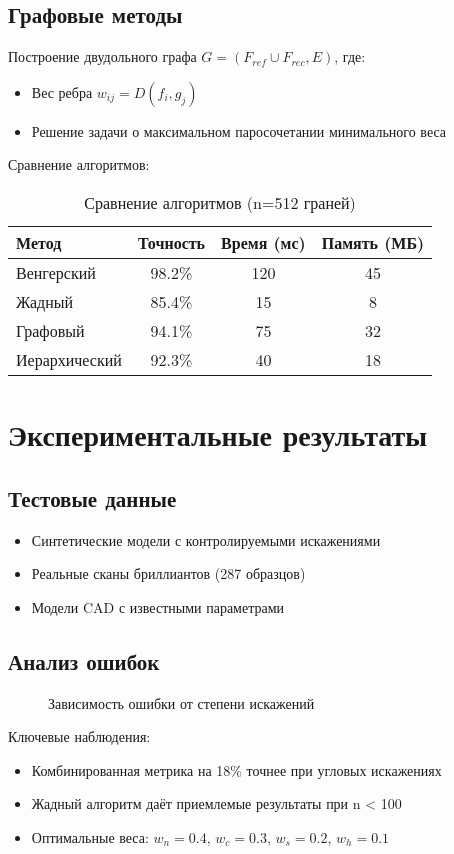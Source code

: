 \documentclass[a4paper,14pt]{extarticle}
\begin{document}
\subsection{Графовые методы}
Построение двудольного графа $G=(F_{ref} \cup F_{rec}, E)$, где:
\begin{itemize}
    \item Вес ребра $w_{ij} = D(f_i, g_j)$
    \item Решение задачи о максимальном паросочетании минимального веса
\end{itemize}

Сравнение алгоритмов:
\begin{table}[H]
\centering
\begin{tabular}{@{}lccc@{}}
\toprule
Метод & Точность & Время (мс) & Память (МБ) \\ \midrule
Венгерский & 98.2\% & 120 & 45 \\
Жадный & 85.4\% & 15 & 8 \\
Графовый & 94.1\% & 75 & 32 \\
Иерархический & 92.3\% & 40 & 18 \\ \bottomrule
\end{tabular}
\caption{Сравнение алгоритмов (n=512 граней)}
\end{table}

\section{Экспериментальные результаты}
\subsection{Тестовые данные}
\begin{itemize}
    \item Синтетические модели с контролируемыми искажениями
    \item Реальные сканы бриллиантов (287 образцов)
    \item Модели CAD с известными параметрами
\end{itemize}

\subsection{Анализ ошибок}
\begin{figure}[H]
\centering
\caption{Зависимость ошибки от степени искажений}
\label{fig:errors}
\end{figure}

Ключевые наблюдения:
\begin{itemize}
    \item Комбинированная метрика на 18\% точнее при угловых искажениях
    \item Жадный алгоритм даёт приемлемые результаты при n < 100
    \item Оптимальные веса: $w_n=0.4$, $w_c=0.3$, $w_s=0.2$, $w_h=0.1$
\end{itemize}
\end{document}
